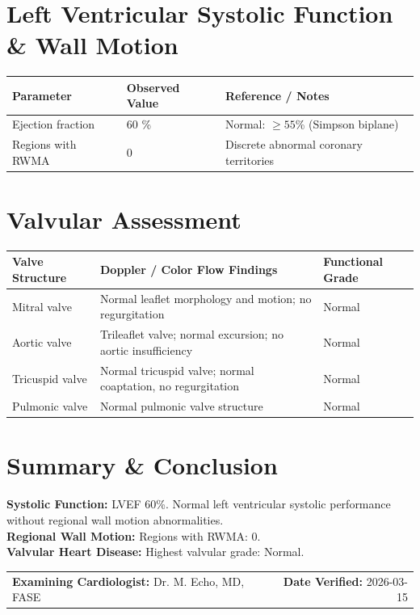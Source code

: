 \documentclass[10pt,a4paper]{article}
\begin{document}
\section*{Left Ventricular Systolic Function \& Wall Motion}

\begin{tabular}{@{} p{6.8cm} p{2.8cm} p{5.5cm} @{}}
  \toprule
  \textbf{Parameter} & \textbf{Observed Value} & \textbf{Reference / Notes} \\
  \midrule
  Ejection fraction & 60 \% & Normal: $\ge 55$\% (Simpson biplane) \\
  Regions with RWMA & 0 & Discrete abnormal coronary territories \\
  \bottomrule
\end{tabular}

\vspace{10pt}

\section*{Valvular Assessment}

\begin{tabular}{@{} p{3.2cm} p{8.4cm} p{3.2cm} @{}}
  \toprule
  \textbf{Valve Structure} & \textbf{Doppler / Color Flow Findings} & \textbf{Functional Grade} \\
  \midrule
  Mitral valve & Normal leaflet morphology and motion; no regurgitation & Normal \\
  Aortic valve & Trileaflet valve; normal excursion; no aortic insufficiency & Normal \\
  Tricuspid valve & Normal tricuspid valve; normal coaptation, no regurgitation & Normal \\
  Pulmonic valve & Normal pulmonic valve structure & Normal \\
  \bottomrule
\end{tabular}

\vspace{10pt}

\section*{Summary \& Conclusion}

\noindent
\textbf{Systolic Function:} LVEF 60\%. Normal left ventricular systolic performance without regional wall motion abnormalities.\\
\textbf{Regional Wall Motion:} Regions with RWMA: 0.\\
\textbf{Valvular Heart Disease:} Highest valvular grade: Normal.

\vspace{18pt}

\noindent
\begin{tabular*}{\textwidth}{@{} l @{\extracolsep{\fill}} r @{}}
  \textbf{Examining Cardiologist:} Dr. M. Echo, MD, FASE & \textbf{Date Verified:} 2026-03-15 \\
\end{tabular*}
\end{document}
